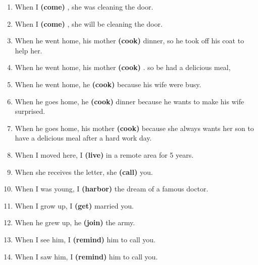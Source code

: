 \documentclass[12pt,a4paper,twoside]{article}
\begin{document}
\begin{enumerate}[label=\textbf{\arabic*.}, leftmargin=2em, itemsep=6pt, topsep=4pt]
\item When I \textbf{(come)} \underline{\hspace{1.3cm}}, she was cleaning the door.
\item When I \textbf{(come)} \underline{\hspace{1.3cm}}, she will be cleaning the door.
\item When he went home, his mother \textbf{(cook)} \underline{\hspace{1.3cm}} dinner, so he took off his coat to help her.
\item When he went home, his mother \textbf{(cook)} \underline{\hspace{1.3cm}}. so be had a delicious meal,
\item When he went home, he \textbf{(cook)} \underline{\hspace{1.3cm}} because his wife were busy.
\item When he goes home, he \textbf{(cook)} \underline{\hspace{1.3cm}} dinner because he wants to make his wife surprised.
\item When he goes home, his mother \textbf{(cook)} \underline{\hspace{1.3cm}} because she always wants her son to have a delicious meal after a hard work day.
\item When I moved here, I \textbf{(live)} \underline{\hspace{1.3cm}} in a remote area for 5 years.
\item When she receives the letter, she \textbf{(call)} \underline{\hspace{1.3cm}} you.
\item When I was young, I \textbf{(harbor)} \underline{\hspace{1.3cm}} the dream of a famous doctor.
\item When I grow up, I \textbf{(get)} \underline{\hspace{1.3cm}} married you.
\item When he grew up, he \textbf{(join)} \underline{\hspace{1.3cm}} the army.
\item When I see him, I \textbf{(remind)} \underline{\hspace{1.3cm}} him to call you.
\item When I saw him, I \textbf{(remind)} \underline{\hspace{1.3cm}} him to call you.
\end{enumerate}
\end{document}
